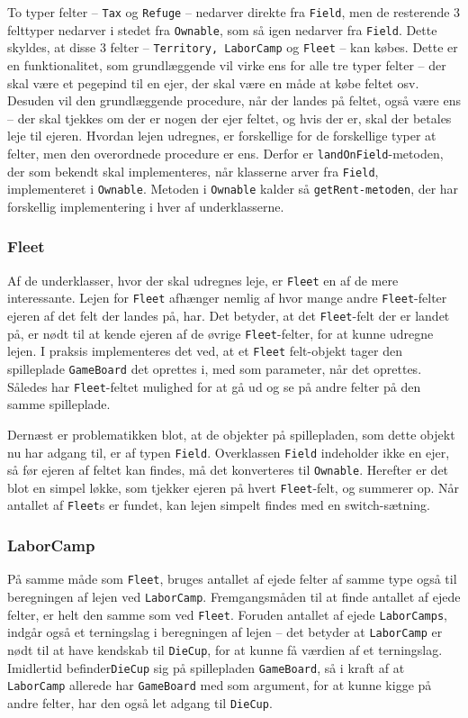 To typer felter – \texttt{Tax} og \texttt{Refuge} – nedarver direkte fra \texttt{Field}, men de resterende 3 felttyper nedarver i stedet fra \texttt{Ownable}, som så igen nedarver fra \texttt{Field}. Dette skyldes, at disse 3 felter – \texttt{Territory, LaborCamp} og \texttt{Fleet} – kan købes. Dette er en funktionalitet, som grundlæggende vil virke ens for alle tre typer felter – der skal være et pegepind til en ejer, der skal være en måde at købe feltet osv.
Desuden vil den grundlæggende procedure, når der landes på feltet, også være ens – der skal tjekkes om der er nogen der ejer feltet, og hvis der er, skal der betales leje til ejeren. Hvordan lejen udregnes, er forskellige for de forskellige typer at felter, men den overordnede procedure er ens. Derfor er \texttt{landOnField}-metoden, der som bekendt skal implementeres, når klasserne arver fra \texttt{Field}, implementeret i \texttt{Ownable}. Metoden i \texttt{Ownable} kalder så \texttt{getRent-metoden}, der har forskellig implementering i hver af underklasserne.
\subsubsection{Fleet}
Af de underklasser, hvor der skal udregnes leje, er \texttt{Fleet} en af de mere interessante. Lejen for \texttt{Fleet} afhænger nemlig af hvor mange andre \texttt{Fleet}-felter ejeren af det felt der landes på, har. Det betyder, at det \texttt{Fleet}-felt der er landet på, er nødt til at kende ejeren af de øvrige \texttt{Fleet}-felter, for at kunne udregne lejen.
I praksis implementeres det ved, at et \texttt{Fleet} felt-objekt tager den spilleplade \texttt{GameBoard} det oprettes i, med som parameter, når det oprettes. Således har \texttt{Fleet}-feltet mulighed for at gå ud og se på andre felter på den samme spilleplade.

Dernæst er problematikken blot, at de objekter på spillepladen, som dette objekt nu har adgang til, er af typen \texttt{Field}. Overklassen \texttt{Field} indeholder ikke en ejer, så før ejeren af feltet kan findes, må det konverteres til \texttt{Ownable}. Herefter er det blot en simpel løkke, som tjekker ejeren på hvert \texttt{Fleet}-felt, og summerer op. Når antallet af \texttt{Fleet}s er fundet, kan lejen simpelt findes med en switch-sætning.
\subsubsection{LaborCamp}
På samme måde som \texttt{Fleet}, bruges antallet af ejede felter af samme type også til beregningen af lejen ved \texttt{LaborCamp}. Fremgangsmåden til at finde antallet af ejede felter, er helt den samme som ved \texttt{Fleet}.
Foruden antallet af ejede \texttt{LaborCamps}, indgår også et terningslag i beregningen af lejen – det betyder at \texttt{LaborCamp} er nødt til at have kendskab til \texttt{DieCup}, for at kunne få værdien af et terningslag. Imidlertid befinder\texttt{DieCup} sig på spillepladen \texttt{GameBoard}, så i kraft af at \texttt{LaborCamp} allerede har \texttt{GameBoard} med som argument, for at kunne kigge på andre felter, har den også let adgang til \texttt{DieCup}.
